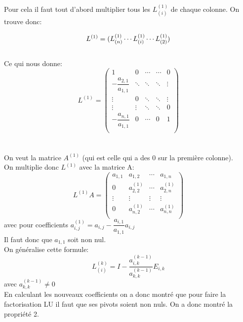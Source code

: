 \documentclass[a4paper,12pt]{report}
\begin{document}
Pour cela il faut tout d'abord multiplier tous les $L_{(i)}^{(1)}$ de chaque colonne.
On trouve donc:

$$L^{(1)}=(L_{(n)}^{(1)}\cdots\\L_{(i)}^{(1)}\cdots\\L_{(2)}^{(1)})$$\\

Ce qui nous donne:\\
$$
L^{(1)}=
\begin{pmatrix}
1 & 0 & \cdots & \cdots & 0\\
-\dfrac{a_{2,1}}{a_{1,1}} & \ddots & \ddots & \ddots & \vdots\\
\vdots & 0 & \ddots & \ddots & \vdots\\
\vdots & \vdots & \ddots & \ddots & 0\\
-\dfrac{a_{n,1}}{a_{1,1}} & 0 & \cdots & 0 &1 \\


\end{pmatrix}
$$\\\\

On veut la matrice $A^{(1)}$ (qui est celle qui a des 0 sur la première colonne).\\
On multiplie donc $L^{(1)}$ avec la matrice A:\\

$$
L^{(1)}A=
\begin{pmatrix}
a_{1,1} & a_{1,2} & \cdots & a_{1,n}\\
0 & a_{2,2}^{(1)} & \cdots & a_{2,n}^{(1)}\\
\vdots & \vdots & \vdots & \vdots\\
0 & a_{n,2}^{(1)} & \cdots & a_{n,n}^{(1)}\\

\end{pmatrix}
$$ avec pour coefficients $a_{i,j}^{(1)}= a_{i,j}-\dfrac{a_{i,1}}{a_{1,1}}a_{i,j}$\\

Il faut donc que ${a_{1,1}}$ soit non nul.\\  

On généralise cette formule:\\
$$L_{(i)}^{(k)}=I-\dfrac{a_{i,k}^{(k-1)}}{a_{k,k}^{(k-1)}}E_{i,k}$$ avec ${a_{k,k}^{(k-1)}}\ne0$\\

En calculant les nouveaux coefficients on a donc montré que pour faire la factorisation LU il faut que ses pivots soient non nuls. On a donc montré la propriété 2.\\\\
\end{document}
